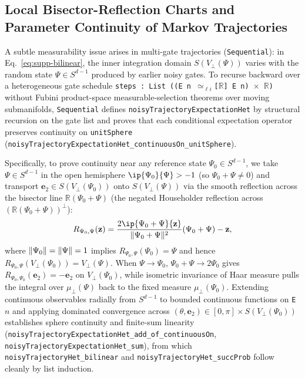 \subsection{Local Bisector-Reflection Charts and Parameter Continuity of Markov Trajectories}
\label{sec:supp-householder}

A subtle measurability issue arises in multi-gate trajectories (\texttt{Sequential}): in Eq.~\eqref{eq:supp-bilinear}, the inner integration domain $S(V_\perp(\Psi))$ varies with the random state $\Psi \in S^{d-1}$ produced by earlier noisy gates. To recurse backward over a heterogeneous gate schedule \texttt{steps : List ((E n $\simeq_{\ell i}$[$\mathbb{R}$] E n) $\times$ $\mathbb{R}$)} without Fubini product-space measurable-selection theorems over moving submanifolds, \texttt{Sequential} defines \texttt{noisyTrajectoryExpectationHet} by structural recursion on the gate list and proves that each conditional expectation operator preserves continuity on \texttt{unitSphere} (\texttt{noisyTrajectoryExpectationHet\_continuousOn\_unitSphere}).

Specifically, to prove continuity near any reference state $\Psi_0 \in S^{d-1}$, we take $\Psi \in S^{d-1}$ in the open hemisphere $\ip{\Psi_0}{\Psi} > -1$ (so $\Psi_0 + \Psi \ne 0$) and transport $\mathbf{e}_2 \in S(V_\perp(\Psi_0))$ onto $S(V_\perp(\Psi))$ via the smooth reflection across the bisector line $\mathbb{R}(\Psi_0 + \Psi)$ (the negated Householder reflection across $(\mathbb{R}(\Psi_0 + \Psi))^\perp$):
\begin{equation}
R_{\Psi_0, \Psi}(\mathbf{z}) = \frac{2\ip{\Psi_0 + \Psi}{\mathbf{z}}}{\norm{\Psi_0 + \Psi}^2}(\Psi_0 + \Psi) - \mathbf{z},
\label{eq:supp-householder}
\end{equation}
where $\lVert\Psi_0\rVert = \lVert\Psi\rVert = 1$ implies $R_{\Psi_0, \Psi}(\Psi_0) = \Psi$ and hence $R_{\Psi_0, \Psi}(V_\perp(\Psi_0)) = V_\perp(\Psi)$. When $\Psi \to \Psi_0$, $\Psi_0 + \Psi \to 2\Psi_0$ gives $R_{\Psi_0, \Psi_0}(\mathbf{e}_2) = -\mathbf{e}_2$ on $V_\perp(\Psi_0)$, while isometric invariance of Haar measure pulls the integral over $\mu_\perp(\Psi)$ back to the fixed measure $\mu_\perp(\Psi_0)$. Extending continuous observables radially from $S^{d-1}$ to bounded continuous functions on \texttt{E} $n$ and applying dominated convergence across $(\theta, \mathbf{e}_2) \in [0, \pi] \times S(V_\perp(\Psi_0))$ establishes sphere continuity and finite-sum linearity (\texttt{noisyTrajectoryExpectationHet\_add\_of\_continuousOn}, \texttt{noisyTrajectoryExpectationHet\_sum}), from which \texttt{noisyTrajectoryHet\_bilinear} and \texttt{noisyTrajectoryHet\_succProb} follow cleanly by list induction.

